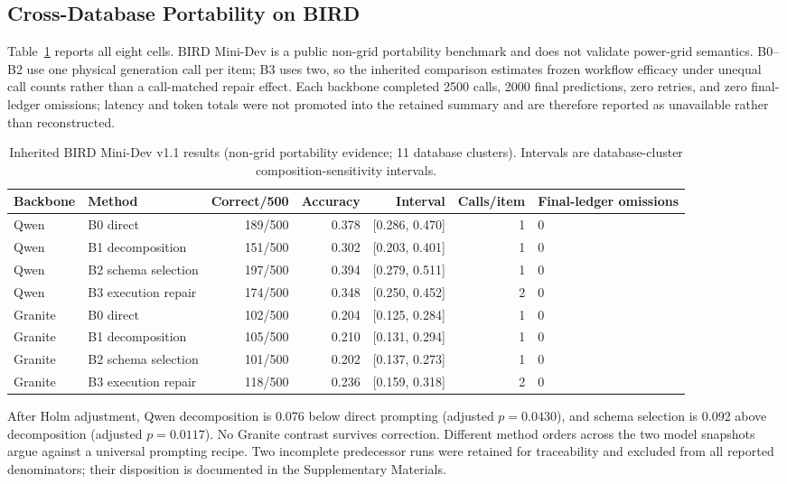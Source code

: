 \documentclass[applsci,article,submit,moreauthors]{Definitions/mdpi}
\begin{document}
\subsection{Cross-Database Portability on BIRD}

Table~\ref{tab:bird} reports all eight cells. BIRD Mini-Dev is a public non-grid portability benchmark and does not validate power-grid semantics. B0--B2 use one physical generation call per item; B3 uses two, so the inherited comparison estimates frozen workflow efficacy under unequal call counts rather than a call-matched repair effect. Each backbone completed 2500 calls, 2000 final predictions, zero retries, and zero final-ledger omissions; latency and token totals were not promoted into the retained summary and are therefore reported as unavailable rather than reconstructed.

\begin{table}[htbp]
\caption{Inherited BIRD Mini-Dev v1.1 results (non-grid portability evidence; 11 database clusters). Intervals are database-cluster composition-sensitivity intervals.}
\label{tab:bird}
\centering
\small
\setlength{\tabcolsep}{3pt}
\begin{tabular}{llrrrrp{1.5cm}}
\toprule
Backbone & Method & Correct/500 & Accuracy & Interval & Calls/item & Final-ledger omissions\\
\midrule
Qwen & B0 direct & 189/500 & 0.378 & [0.286, 0.470] & 1 & 0\\
Qwen & B1 decomposition & 151/500 & 0.302 & [0.203, 0.401] & 1 & 0\\
Qwen & B2 schema selection & 197/500 & 0.394 & [0.279, 0.511] & 1 & 0\\
\cmidrule(lr){1-7}
Qwen & B3 execution repair & 174/500 & 0.348 & [0.250, 0.452] & 2 & 0\\
Granite & B0 direct & 102/500 & 0.204 & [0.125, 0.284] & 1 & 0\\
Granite & B1 decomposition & 105/500 & 0.210 & [0.131, 0.294] & 1 & 0\\
Granite & B2 schema selection & 101/500 & 0.202 & [0.137, 0.273] & 1 & 0\\
\cmidrule(lr){1-7}
Granite & B3 execution repair & 118/500 & 0.236 & [0.159, 0.318] & 2 & 0\\
\bottomrule
\end{tabular}
\end{table}

After Holm adjustment, Qwen decomposition is 0.076 below direct prompting (adjusted $p=0.0430$), and schema selection is 0.092 above decomposition (adjusted $p=0.0117$). No Granite contrast survives correction. Different method orders across the two model snapshots argue against a universal prompting recipe. Two incomplete predecessor runs were retained for traceability and excluded from all reported denominators; their disposition is documented in the Supplementary Materials.
\end{document}
